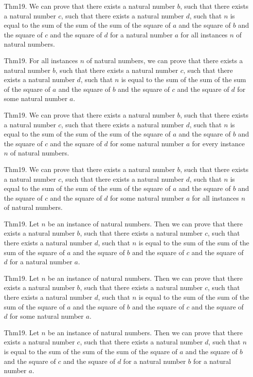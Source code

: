 \documentclass{article}
\begin{document}
Thm19. We can prove that there exists a natural number $b$, such that there exists a natural number $c$, such that there exists a natural number $d$, such that $n$ is equal to the sum of the sum of the sum of the square of $a$ and the square of $b$ and the square of $c$ and the square of $d$ for a natural number $a$ for all instances $n$ of natural numbers.

Thm19. For all instances $n$ of natural numbers, we can prove that there exists a natural number $b$, such that there exists a natural number $c$, such that there exists a natural number $d$, such that $n$ is equal to the sum of the sum of the sum of the square of $a$ and the square of $b$ and the square of $c$ and the square of $d$ for some natural number $a$.

Thm19. We can prove that there exists a natural number $b$, such that there exists a natural number $c$, such that there exists a natural number $d$, such that $n$ is equal to the sum of the sum of the sum of the square of $a$ and the square of $b$ and the square of $c$ and the square of $d$ for some natural number $a$ for every instance $n$ of natural numbers.

Thm19. We can prove that there exists a natural number $b$, such that there exists a natural number $c$, such that there exists a natural number $d$, such that $n$ is equal to the sum of the sum of the sum of the square of $a$ and the square of $b$ and the square of $c$ and the square of $d$ for some natural number $a$ for all instances $n$ of natural numbers.

Thm19. Let $n$ be an instance of natural numbers. Then we can prove that there exists a natural number $b$, such that there exists a natural number $c$, such that there exists a natural number $d$, such that $n$ is equal to the sum of the sum of the sum of the square of $a$ and the square of $b$ and the square of $c$ and the square of $d$ for a natural number $a$.

Thm19. Let $n$ be an instance of natural numbers. Then we can prove that there exists a natural number $b$, such that there exists a natural number $c$, such that there exists a natural number $d$, such that $n$ is equal to the sum of the sum of the sum of the square of $a$ and the square of $b$ and the square of $c$ and the square of $d$ for some natural number $a$.

Thm19. Let $n$ be an instance of natural numbers. Then we can prove that there exists a natural number $c$, such that there exists a natural number $d$, such that $n$ is equal to the sum of the sum of the sum of the square of $a$ and the square of $b$ and the square of $c$ and the square of $d$ for a natural number $b$ for a natural number $a$.
\end{document}

